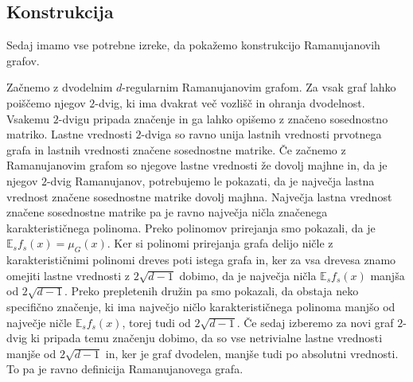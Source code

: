 \subsection{Konstrukcija}
Sedaj imamo vse potrebne izreke, da pokažemo konstrukcijo Ramanujanovih grafov.

Začnemo z dvodelnim \(d\)-regularnim Ramanujanovim grafom. Za vsak graf lahko poiščemo njegov \(2\)-dvig, ki ima dvakrat več vozlišč in ohranja dvodelnost. Vsakemu \(2\)-dvigu pripada značenje in ga lahko opišemo z značeno sosednostno matriko. Lastne vrednosti \(2\)-dviga so ravno unija lastnih vrednosti prvotnega grafa in lastnih vrednosti značene sosednostne matrike. Če začnemo z Ramanujanovim grafom so njegove lastne vrednosti že dovolj majhne in, da je njegov \(2\)-dvig Ramanujanov, potrebujemo le pokazati, da je največja lastna vrednost značene sosednostne matrike dovolj majhna. Največja lastna vrednost značene sosednostne matrike pa je ravno največja ničla značenega karakterističnega polinoma. Preko polinomov prirejanja smo pokazali, da je \(\mathbb E_{s}f_s(x) = \mu_G(x)\). Ker si polinomi prirejanja grafa delijo ničle z karakterističnimi polinomi dreves poti istega grafa in, ker za vsa drevesa znamo omejiti lastne vrednosti z \(2\sqrt{d-1}\) dobimo, da je največja ničla \(\mathbb E_{s}f_s(x)\) manjša od \(2\sqrt{d-1}\). Preko prepletenih družin pa smo pokazali, da obstaja neko specifično značenje, ki ima največjo ničlo karakterističnega polinoma manjšo od največje ničle \(\mathbb E_{s}f_s(x)\), torej tudi od \(2\sqrt{d-1}\). Če sedaj izberemo za novi graf \(2\)-dvig ki pripada temu značenju dobimo, da so vse netrivialne lastne vrednosti manjše od \(2\sqrt{d-1}\) in, ker je graf dvodelen, manjše tudi po absolutni vrednosti. To pa je ravno definicija Ramanujanovega grafa.